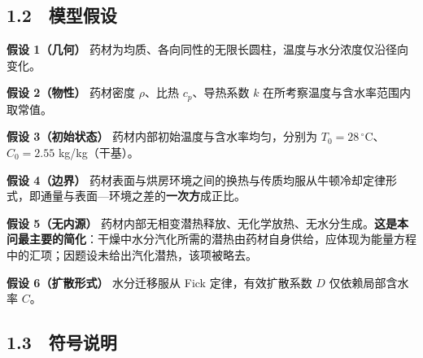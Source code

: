\documentclass[12pt,a4paper]{ctexart}
\begin{document}
\subsection*{1.2　模型假设}

\textbf{假设 1（几何）} 药材为均质、各向同性的无限长圆柱，温度与水分浓度仅沿径向变化。

\textbf{假设 2（物性）} 药材密度 $\rho$、比热 $c_p$、导热系数 $k$ 在所考察温度与含水率范围内取常值。

\textbf{假设 3（初始状态）} 药材内部初始温度与含水率均匀，分别为 $T_0=28\,^\circ$C、$C_0=2.55$ kg/kg（干基）。

\textbf{假设 4（边界）} 药材表面与烘房环境之间的换热与传质均服从牛顿冷却定律形式，即通量与表面—环境之差的\textbf{一次方}成正比。

\textbf{假设 5（无内源）} 药材内部无相变潜热释放、无化学放热、无水分生成。\textbf{这是本问最主要的简化}：干燥中水分汽化所需的潜热由药材自身供给，应体现为能量方程中的汇项；因题设未给出汽化潜热，该项被略去。

\textbf{假设 6（扩散形式）} 水分迁移服从 Fick 定律，有效扩散系数 $D$ 仅依赖局部含水率 $C$。

\subsection*{1.3　符号说明}

\begin{table}[H]
\centering
\caption{符号说明}
\end{table}
\end{document}

